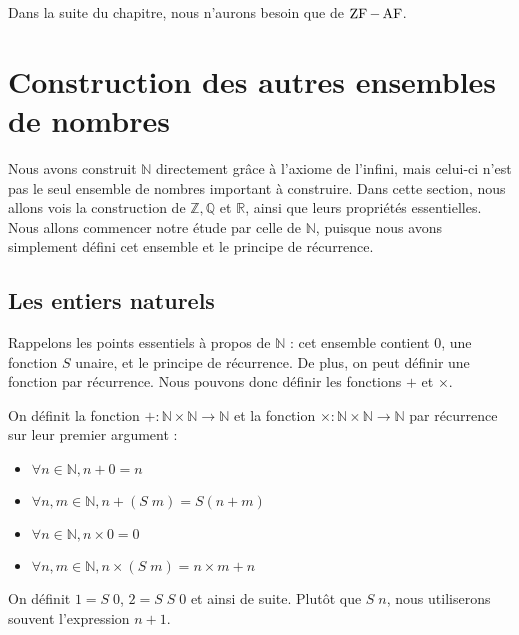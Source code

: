 Dans la suite du chapitre, nous n'aurons besoin que de $\operatorname{ZF} - \operatorname{AF}$.

\section{Construction des autres ensembles de nombres}

Nous avons construit $\mathbb N$ directement grâce à l'axiome de l'infini, mais
celui-ci n'est pas le seul ensemble de nombres important à construire. Dans
cette section, nous allons vois la construction de $\mathbb Z, \mathbb Q$ et
$\mathbb R$, ainsi que leurs propriétés essentielles. Nous allons commencer
notre étude par celle de $\mathbb N$, puisque nous avons simplement défini cet
ensemble et le principe de récurrence.

\subsection{Les entiers naturels}

Rappelons les points essentiels à propos de $\mathbb N$ : cet ensemble contient
$0$, une fonction $S$ unaire, et le principe de récurrence. De plus, on peut
définir une fonction par récurrence. Nous pouvons donc définir les fonctions
$+$ et $\times$.

\begin{definition}
  On définit la fonction $+ : \mathbb N \times \mathbb N \to \mathbb N$ et la
  fonction $\times : \mathbb N \times \mathbb N \to \mathbb N$ par récurrence
  sur leur premier argument :
  \begin{itemize}
  \item $\forall n \in \mathbb N, n + 0 = n$
  \item $\forall n,m\in \mathbb N, n + (S\;m) = S(n + m)$
  \item $\forall n \in \mathbb N, n \times 0 = 0$
  \item $\forall n,m\in\mathbb N, n \times (S\;m) = n\times m + n$
  \end{itemize}
\end{definition}

\begin{notation}
  On définit $1 = S\;0$, $2 = S\;S\;0$ et ainsi de suite. Plutôt que $S\;n$,
  nous utiliserons souvent l'expression $n + 1$.
\end{notation}

